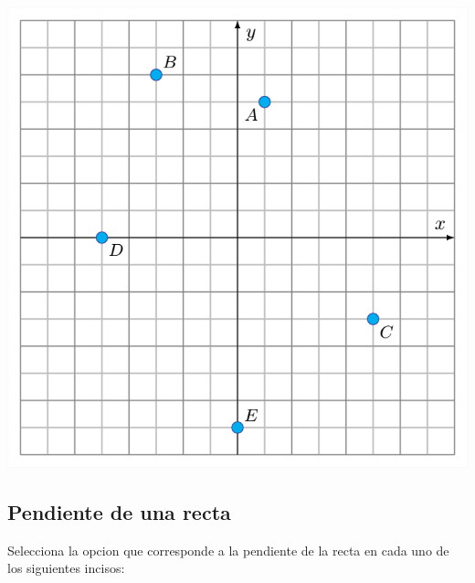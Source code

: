 \documentclass[12pt,addpoints]{evalua}
\begin{document}
\begin{questions}
\begin{multicols}{2}
            \includegraphics[width=0.8\linewidth]{../images/imagen_plano01.png}
      \end{multicols}

      



      
	\subsection{Pendiente de una recta}

      \question[8] Selecciona la opcion que corresponde a la pendiente de la recta en cada uno de los siguientes incisos:
    
      \begin{multicols}{2}
            \begin{parts}

\end{parts}
\end{multicols}
\end{questions}
\end{document}
